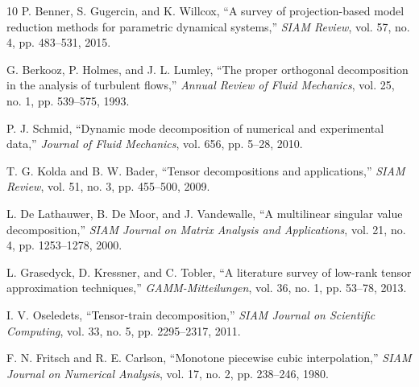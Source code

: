 \documentclass[conference]{IEEEtran}
\begin{document}
\begin{thebibliography}{10}
P. Benner, S. Gugercin, and K. Willcox, ``A survey of projection-based model reduction methods for parametric dynamical systems,'' \textit{SIAM Review}, vol. 57, no. 4, pp. 483--531, 2015.

G. Berkooz, P. Holmes, and J. L. Lumley, ``The proper orthogonal decomposition in the analysis of turbulent flows,'' \textit{Annual Review of Fluid Mechanics}, vol. 25, no. 1, pp. 539--575, 1993.

P. J. Schmid, ``Dynamic mode decomposition of numerical and experimental data,'' \textit{Journal of Fluid Mechanics}, vol. 656, pp. 5--28, 2010.

T. G. Kolda and B. W. Bader, ``Tensor decompositions and applications,'' \textit{SIAM Review}, vol. 51, no. 3, pp. 455--500, 2009.

L. De Lathauwer, B. De Moor, and J. Vandewalle, ``A multilinear singular value decomposition,'' \textit{SIAM Journal on Matrix Analysis and Applications}, vol. 21, no. 4, pp. 1253--1278, 2000.

L. Grasedyck, D. Kressner, and C. Tobler, ``A literature survey of low-rank tensor approximation techniques,'' \textit{GAMM-Mitteilungen}, vol. 36, no. 1, pp. 53--78, 2013.

I. V. Oseledets, ``Tensor-train decomposition,'' \textit{SIAM Journal on Scientific Computing}, vol. 33, no. 5, pp. 2295--2317, 2011.

F. N. Fritsch and R. E. Carlson, ``Monotone piecewise cubic interpolation,'' \textit{SIAM Journal on Numerical Analysis}, vol. 17, no. 2, pp. 238--246, 1980.

\end{thebibliography}
\end{document}
